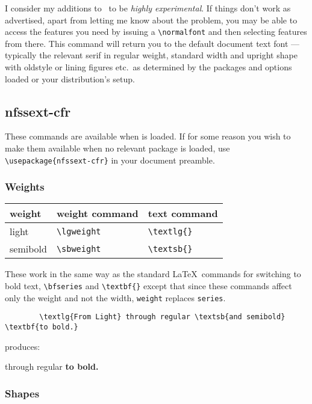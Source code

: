 \documentclass[11pt,british]{article}
\begin{document}
	I consider my additions to \ to be \emph{highly experimental}. If things don't work as advertised, apart from letting me know about the problem, you may be able to access the features you need by issuing a \verb|\normalfont| and then selecting features from there. This command will return you to the default document text font --- typically the relevant serif in regular weight, standard width and upright shape with oldstyle or lining figures etc.\ as determined by the packages and options loaded or your distribution's setup.
	
\subsection{nfssext-cfr}

These commands are available when  is loaded. If for some reason you wish to make them available when no relevant package is loaded, use \verb|\usepackage{nfssext-cfr}| in your document preamble.

\subsubsection{Weights}

	\begin{longtable}{lll}
		\toprule
		\textbf{weight}		&	\textbf{weight command}	&	\textbf{text command}\\\midrule\endhead
		\bottomrule\endfoot
		light							&	\verb|\lgweight|						&	\verb|\textlg{}|\\
		semibold					&	\verb|\sbweight|					&	\verb|\textsb{}|\\
	\end{longtable}
	
	These work in the same way as the standard \LaTeX\ commands for switching to bold text, \verb|\bfseries| and \verb|\textbf{}| except that since these commands affect only the weight and not the width, \verb|weight| replaces \verb|series|.
	\begin{verbatim}
		\textlg{From Light} through regular	\textsb{and semibold} \textbf{to bold.}
	\end{verbatim}
	produces:
	\begin{center}
		 through regular	 \textbf{to bold.}
	\end{center}

\subsubsection{Shapes}
\end{document}
